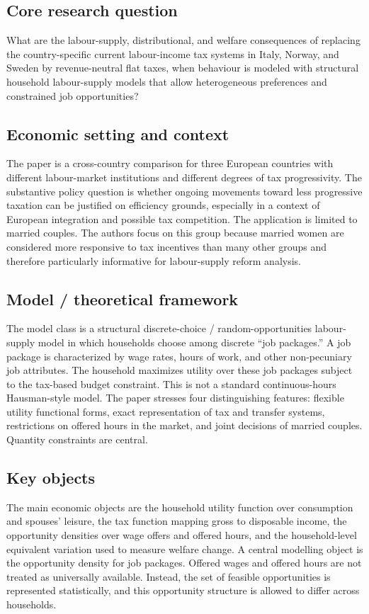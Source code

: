 \documentclass[11pt,a4paper]{article}
\begin{document}
\subsection*{Core research question}
What are the labour-supply, distributional, and welfare consequences of replacing the country-specific current labour-income tax systems in Italy, Norway, and Sweden by revenue-neutral flat taxes, when behaviour is modeled with structural household labour-supply models that allow heterogeneous preferences and constrained job opportunities?

\subsection*{Economic setting and context}
The paper is a cross-country comparison for three European countries with different labour-market institutions and different degrees of tax progressivity. The substantive policy question is whether ongoing movements toward less progressive taxation can be justified on efficiency grounds, especially in a context of European integration and possible tax competition. The application is limited to married couples. The authors focus on this group because married women are considered more responsive to tax incentives than many other groups and therefore particularly informative for labour-supply reform analysis.

\subsection*{Model / theoretical framework}
The model class is a structural discrete-choice / random-opportunities labour-supply model in which households choose among discrete “job packages.” A job package is characterized by wage rates, hours of work, and other non-pecuniary job attributes. The household maximizes utility over these job packages subject to the tax-based budget constraint. This is not a standard continuous-hours Hausman-style model. The paper stresses four distinguishing features: flexible utility functional forms, exact representation of tax and transfer systems, restrictions on offered hours in the market, and joint decisions of married couples. Quantity constraints are central.

\subsection*{Key objects}
The main economic objects are the household utility function over consumption and spouses’ leisure, the tax function mapping gross to disposable income, the opportunity densities over wage offers and offered hours, and the household-level equivalent variation used to measure welfare change. A central modelling object is the opportunity density for job packages. Offered wages and offered hours are not treated as universally available. Instead, the set of feasible opportunities is represented statistically, and this opportunity structure is allowed to differ across households.
\end{document}
